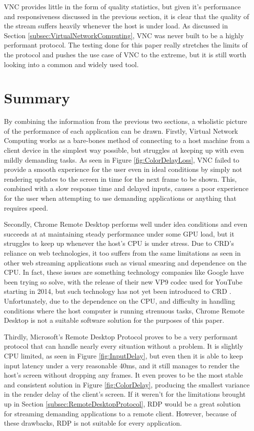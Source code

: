 VNC provides little in the form of quality statistics, but given it's performance and responsiveness discussed in the previous section, it is clear that the quality of the stream suffers heavily whenever the host is under load.
As discussed in Section \ref{subsec:VirtualNetworkComputing}, VNC was never built to be a highly performant protocol.
The testing done for this paper really stretches the limits of the protocol and pushes the use case of VNC to the extreme, but it is still worth looking into a common and widely used tool.

\section{Summary}\label{sec:EvaluationSummary}

By combining the information from the previous two sections, a wholistic picture of the performance of each application can be drawn. Firstly, Virtual Network Computing works as a bare-bones method of connecting to a host machine from a client device in the simplest way possible, but struggles at keeping up with even mildly demanding tasks.
As seen in Figure \ref{fig:ColorDelayLoss}, VNC failed to provide a smooth experience for the user even in ideal conditions by simply not rendering updates to the screen in time for the next frame to be shown.
This, combined with a slow response time and delayed inputs, causes a poor experience for the user when attempting to use demanding applications or anything that requires speed.

Secondly, Chrome Remote Desktop performs well under idea conditions and even succeeds at at maintaining steady performance under some GPU load, but it struggles to keep up whenever the host's CPU is under stress.
Due to CRD's reliance on web technologies, it too suffers from the same limitations as seen in other web streaming applications such as visual smearing and dependence on the CPU.
In fact, these issues are something technology companies like Google have been trying so solve, with the release of their new VP9 codec used for YouTube starting in 2014, but such technology has not yet been introduced to CRD \cite{google_io_vp9}.
Unfortunately, due to the dependence on the CPU, and difficulty in handling conditions where the host computer is running strenuous tasks, Chrome Remote Desktop is not a suitable software solution for the purposes of this paper.

Thirdly, Microsoft's Remote Desktop Protocol proves to be a very performant protocol that can handle nearly every situation without a problem.
It is slightly CPU limited, as seen in Figure \ref{fig:InputDelay}, but even then it is able to keep input latency under a very reasonable 40ms, and it still manages to render the host's screen without dropping any frames.
It even proves to be the most stable and consistent solution in Figure \ref{fig:ColorDelay}, producing the smallest variance in the render delay of the client's screen.
If it weren't for the limitations brought up in Section \ref{subsec:RemoteDesktopProtocol}, RDP would be a great solution for streaming demanding applications to a remote client.
However, because of these drawbacks, RDP is not suitable for every application.

